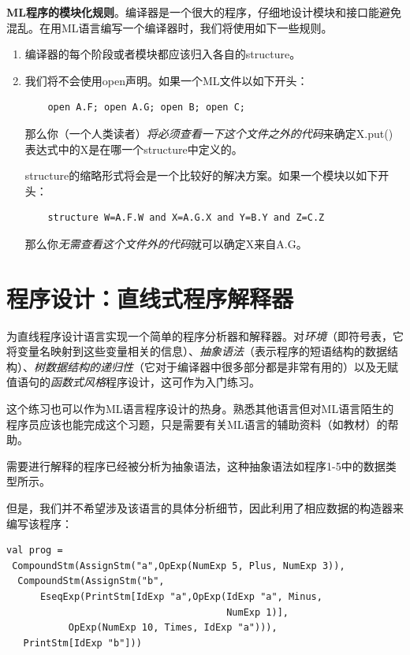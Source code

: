 \documentclass[cn,11pt,chinese]{elegantbook}
\begin{document}
\textbf{ML程序的模块化规则}。编译器是一个很大的程序，仔细地设计模块和接口能避免混乱。在用ML语言编写一个编译器时，我们将使用如下一些规则。

\begin{enumerate}
  \item 编译器的每个阶段或者模块都应该归入各自的structure。
  \item 我们将不会使用open声明。如果一个ML文件以如下开头：
  \begin{verbatim}
    open A.F; open A.G; open B; open C;
  \end{verbatim}
  那么你（一个人类读者）\textit{将必须查看一下这个文件之外的代码}来确定X.put()表达式中的X是在哪一个structure中定义的。

  structure的缩略形式将会是一个比较好的解决方案。如果一个模块以如下开头：
  \begin{verbatim}
    structure W=A.F.W and X=A.G.X and Y=B.Y and Z=C.Z
  \end{verbatim}
  那么你\textit{无需查看这个文件外的代码}就可以确定X来自A.G。
\end{enumerate}

\section{程序设计：直线式程序解释器}

为直线程序设计语言实现一个简单的程序分析器和解释器。对\textit{环境}（即符号表，它将变量名映射到这些变量相关的信息）、\textit{抽象语法}（表示程序的短语结构的数据结构）、\textit{树数据结构的递归性}（它对于编译器中很多部分都是非常有用的）以及无赋值语句的\textit{函数式风格}程序设计，这可作为入门练习。

这个练习也可以作为ML语言程序设计的热身。熟悉其他语言但对ML语言陌生的程序员应该也能完成这个习题，只是需要有关ML语言的辅助资料（如教材）的帮助。

需要进行解释的程序已经被分析为抽象语法，这种抽象语法如程序1-5中的数据类型所示。

但是，我们并不希望涉及该语言的具体分析细节，因此利用了相应数据的构造器来编写该程序：

\begin{verbatim}
val prog =
 CompoundStm(AssignStm("a",OpExp(NumExp 5, Plus, NumExp 3)),
  CompoundStm(AssignStm("b",
      EseqExp(PrintStm[IdExp "a",OpExp(IdExp "a", Minus,
                                       NumExp 1)],
           OpExp(NumExp 10, Times, IdExp "a"))),
   PrintStm[IdExp "b"]))
\end{verbatim}
\end{document}
